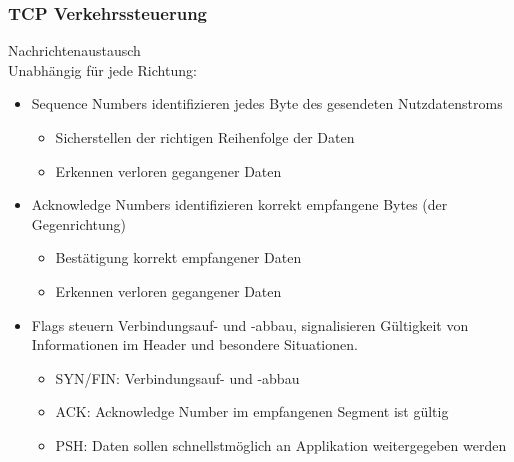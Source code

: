 \subsubsection{TCP Verkehrssteuerung}

\begin{concept}{Nachrichtenaustausch}\\
    Unabhängig für jede Richtung:
    \begin{itemize}
        \item Sequence Numbers identifizieren jedes Byte des gesendeten Nutzdatenstroms
        \begin{itemize}
            \item Sicherstellen der richtigen Reihenfolge der Daten
            \item Erkennen verloren gegangener Daten
        \end{itemize}
        \item Acknowledge Numbers identifizieren korrekt empfangene Bytes (der Gegenrichtung)
        \begin{itemize}
            \item Bestätigung korrekt empfangener Daten
            \item Erkennen verloren gegangener Daten
        \end{itemize}
        \item Flags steuern Verbindungsauf- und -abbau, signalisieren Gültigkeit von Informationen im Header und besondere Situationen.
        \begin{itemize}
            \item SYN/FIN: Verbindungsauf- und -abbau
            \item ACK: Acknowledge Number im empfangenen Segment ist gültig
            \item PSH: Daten sollen schnellstmöglich an Applikation weitergegeben werden
        \end{itemize}
    \end{itemize}
\end{concept}

